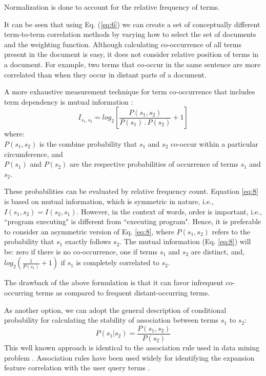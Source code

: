Normalization is done to account for the relative frequency of terms.

It can be seen that using Eq. (\ref{eq:6}) we can create a set of conceptually different term-to-term correlation methods by varying how to select the set of documents and the weighting function. Although calculating co-occurrence of all terms present in the document is easy, it does not consider relative position of terms in a document. For example, two terms that co-occur in the same sentence are more correlated than when they occur in distant parts of a document.

A more exhaustive measurement technique for term co-occurrence that includes term dependency is mutual information \cite{church1990word}:
\begin{equation}\label{eq:8}
I_{s_1, s_2}= log_2 \left[\frac{P(s_1, s_2)}{P(s_1)\,.\, P(s_2)}+ 1\right]
\end{equation}
where: \\$P(s_1, s_2)$ is the combine probability that $s_1$ and $s_2$ co-occur within a particular circumference, and \\$P(s_1)$ and $P(s_2)$ are the respective probabilities of occurrence of terms $s_1$ and $s_2$. 


These probabilities can be evaluated by relative frequency count.
Equation \ref{eq:8} is based on mutual information, which is symmetric in nature, i.e., $I(s_1, s_2)= I(s_2, s_1)$. However, in the context of words, order is important, i.e., ``program executing" is different from ``executing program". Hence, it is preferable to consider an asymmetric version of Eq. \ref{eq:8}, where $P(s_1, s_2)$ refers to the probability that $s_1$ exactly follows $s_2$. The mutual information (Eq. \ref{eq:8}) will be: zero if there is no co-occurrence, one if terms $s_1$ and $s_2$ are distinct, and, $log_2 \left(\frac{1}{P(s_1)}+1\right)$ if $s_1$ is completely correlated to $s_2$. 

The drawback of the above formulation is that it can favor infrequent co-occurring terms as compared to frequent distant-occurring terms.

As another option, we can adopt the general description of conditional probability for calculating the stability of association between terms $s_1$ to $s_2$: 
\begin{equation}
P(s_1|s_2)=\dfrac{P(s_1, s_2)}{P(s_2)}
\end{equation}
This well known approach \cite{bai2005query} is identical to the association rule used in data mining problem \cite{agrawal1993mining,vaidya2002privacy}. Association rules have been used widely for identifying the expansion feature correlation with the user query terms \cite{song2007integration,latiri2012towards}. 

